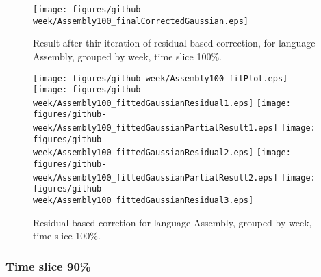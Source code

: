 \begin{figure}[]
\centering
{\texttt{[image: figures/github-week/Assembly100\_finalCorrectedGaussian.eps]}}
\caption{Result after thir iteration of residual-based correction, for language Assembly, grouped by week, time slice 100\%.}
\end{figure}


\begin{figure}[hb]
\centering
{}
{\texttt{[image: figures/github-week/Assembly100\_fitPlot.eps]}}
{\texttt{[image: figures/github-week/Assembly100\_fittedGaussianResidual1.eps]}}
{\texttt{[image: figures/github-week/Assembly100\_fittedGaussianPartialResult1.eps]}}
{\texttt{[image: figures/github-week/Assembly100\_fittedGaussianResidual2.eps]}}
{\texttt{[image: figures/github-week/Assembly100\_fittedGaussianPartialResult2.eps]}}
{\texttt{[image: figures/github-week/Assembly100\_fittedGaussianResidual3.eps]}}
\caption{Residual-based corretion for language Assembly, grouped by week, time slice 100\%.}
\end{figure}


\clearpage 
\newpage 


\FloatBarrier

\subsubsection{Time slice 90\%}

